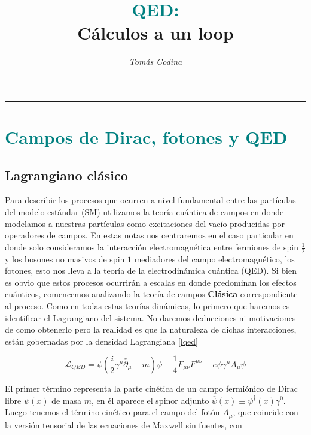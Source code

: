 \documentclass[tickz]{article}
\title{\vspace{-35pt}\huge{\textbf{\textcolor{teal}{QED:}}} \\ \vspace{0.1cm} \large{\textbf{Cálculos a un loop}}}
\date{\vspace{-20pt}}
\author{\textit{Tomás Codina}}
\numberwithin{equation}{section}
\begin{document}
\maketitle
\thispagestyle{fancy}






 

\rule{\textwidth}{0.4pt}


\section{\textcolor{teal}{Campos de Dirac, fotones y QED}}\label{sim}
	
\subsection{Lagrangiano clásico}
Para describir los procesos que ocurren a nivel fundamental entre las
partículas del modelo estándar (SM) utilizamos la teoría cuántica de campos
en donde modelamos a nuestras partículas como excitaciones del vacío
producidas por operadores de campos. En estas notas nos centraremos en el caso particular en donde solo consideramos la interacción electromagnética entre fermiones de spin $ \frac{1}{2} $ y los bosones no masivos de spin $ 1 $ mediadores del campo electromagnético, los fotones, esto nos lleva a la teoría de la electrodinámica cuántica (QED). Si bien es obvio que estos procesos ocurrirán a escalas en donde predominan los efectos cuánticos, comencemos analizando la teoría de campos \textbf{Clásica} correspondiente al proceso. Como en todas estas teorías dinámicas, lo primero que haremos es identificar el Lagrangiano del sistema. No daremos deducciones ni motivaciones de como obtenerlo pero la realidad es que la naturaleza de dichas interacciones, están gobernadas por la densidad Lagrangiana \ref{lqed}

\begin{equation}\label{lqed}
\mathscr{L}_{QED}=\overline{\psi}\left(\frac{i}{2}\gamma^{\mu}
\overleftrightarrow{\partial_{\mu}}-m\right)\psi-\frac{1}{4}F_{\mu\nu}F^{\mu\nu}-e\overline{\psi}\gamma^{\mu}A_{\mu}\psi
\end{equation}

El primer término representa la parte cinética de un campo fermiónico de Dirac libre $ \psi(x) $ de masa $ m $, en él aparece el spinor adjunto $ \overline{\psi}(x)\equiv\psi^{\dagger}(x) \gamma^0 $. Luego tenemos el término cinético para el campo del fotón $ A_{\mu} $, que coincide con la versión tensorial de las ecuaciones de Maxwell sin fuentes, con
\end{document}
